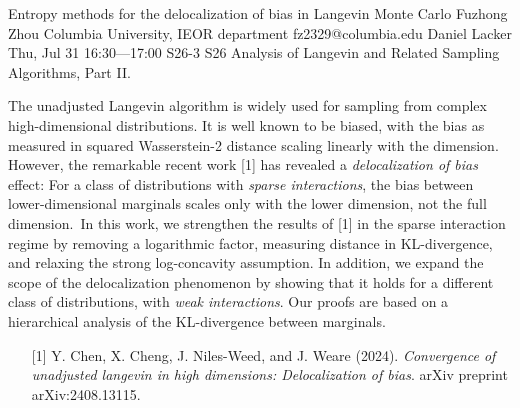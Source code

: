 \begin{talk}
  {Entropy methods for the delocalization of bias in Langevin Monte Carlo}%
  {Fuzhong Zhou}%
  {Columbia University, IEOR department}%
  {fz2329@columbia.edu}%
  {Daniel Lacker}%
  {}%
  {Thu, Jul 31 16:30---17:00}%
  {S26-3}%
  {S26}%
  {Analysis of
   Langevin and Related Sampling Algorithms, Part II.}%
    
   
The unadjusted Langevin algorithm is widely used for sampling from complex high-dimensional distributions. It is well known to be biased, with the bias as measured in squared Wasserstein-2 distance scaling linearly with the dimension. However, the remarkable recent work [1] has revealed a \textit{delocalization of bias} effect: For a class of distributions with \textit{sparse interactions}, the bias between lower-dimensional marginals scales only with the lower dimension, not the full dimension. In this work, we strengthen the results of [1] in the sparse interaction regime by removing a logarithmic factor, measuring distance in KL-divergence, and relaxing the strong log-concavity assumption. In addition, we expand the scope of the delocalization phenomenon by showing that it holds for a different class of distributions, with \textit{weak interactions}. Our proofs are based on a hierarchical analysis of the KL-divergence between marginals.



\medskip



\begin{enumerate}
 \item[{[1]}] Y. Chen, X. Cheng, J. Niles-Weed, and J. Weare (2024). {\it Convergence of unadjusted langevin in high dimensions: Delocalization of bias}. arXiv preprint arXiv:2408.13115.
\end{enumerate}


\end{talk}

